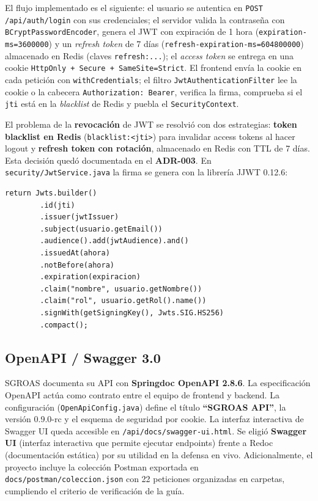 El flujo implementado es el siguiente: el usuario se autentica en \texttt{POST /api/auth/login} con sus
credenciales; el servidor valida la contraseña con \texttt{BCryptPasswordEncoder}, genera el JWT con
expiración de 1 hora (\texttt{expiration-ms=3600000}) y un \textit{refresh token} de 7 días
(\texttt{refresh-expiration-ms=604800000}) almacenado en Redis (claves \texttt{refresh:...}); el \textit{access
token} se entrega en una cookie \texttt{HttpOnly + Secure + SameSite=Strict}. El frontend envía la cookie en cada
petición con \texttt{withCredentials}; el filtro \texttt{JwtAuthenticationFilter} lee la cookie o la cabecera
\texttt{Authorization: Bearer}, verifica la firma, comprueba si el \texttt{jti} está en la \textit{blacklist} de
Redis y puebla el \texttt{SecurityContext}.

El problema de la \textbf{revocación} de JWT se resolvió con dos estrategias: \textbf{token blacklist en Redis}
(\texttt{blacklist:<jti>}) para invalidar access tokens al hacer logout y \textbf{refresh token con rotación},
almacenado en Redis con TTL de 7 días. Esta decisión quedó documentada en el \textbf{ADR-003}. En
\texttt{security/JwtService.java} la firma se genera con la librería JJWT 0.12.6:

\begin{lstlisting}[style=javaStyle, label=lst:jwt, caption={JwtService.java — generación del token (fragmento)}]
return Jwts.builder()
        .id(jti)
        .issuer(jwtIssuer)
        .subject(usuario.getEmail())
        .audience().add(jwtAudience).and()
        .issuedAt(ahora)
        .notBefore(ahora)
        .expiration(expiracion)
        .claim("nombre", usuario.getNombre())
        .claim("rol", usuario.getRol().name())
        .signWith(getSigningKey(), Jwts.SIG.HS256)
        .compact();
\end{lstlisting}

\subsection{OpenAPI / Swagger 3.0}

SGROAS documenta su API con \textbf{Springdoc OpenAPI 2.8.6}. La especificación OpenAPI actúa como contrato entre
el equipo de frontend y backend. La configuración (\texttt{OpenApiConfig.java}) define el título
\textbf{``SGROAS API''}, la versión 0.9.0-rc y el esquema de seguridad por cookie. La interfaz interactiva de
Swagger UI queda accesible en \texttt{/api/docs/swagger-ui.html}. Se eligió \textbf{Swagger UI} (interfaz
interactiva que permite ejecutar endpoints) frente a Redoc (documentación estática) por su utilidad en la defensa en
vivo. Adicionalmente, el proyecto incluye la colección Postman exportada en
\texttt{docs/postman/coleccion.json} con 22 peticiones organizadas en carpetas, cumpliendo el criterio de
verificación de la guía.

